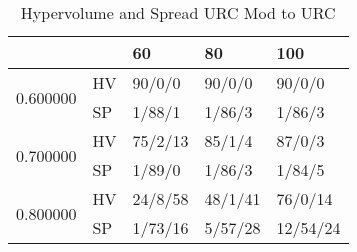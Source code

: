 \begin{table}
\caption{Hypervolume and Spread URC Mod to URC}
\begin{tabular}{lllll}
\toprule
 &  & 60 & 80 & 100 \\
\midrule
\multirow[t]{2}{*}{0.600000} & HV & 90/0/0 & 90/0/0 & 90/0/0 \\
 & SP & 1/88/1 & 1/86/3 & 1/86/3 \\
\cline{1-5}
\multirow[t]{2}{*}{0.700000} & HV & 75/2/13 & 85/1/4 & 87/0/3 \\
 & SP & 1/89/0 & 1/86/3 & 1/84/5 \\
\cline{1-5}
\multirow[t]{2}{*}{0.800000} & HV & 24/8/58 & 48/1/41 & 76/0/14 \\
 & SP & 1/73/16 & 5/57/28 & 12/54/24 \\
\cline{1-5}
\bottomrule
\end{tabular}
\end{table}
